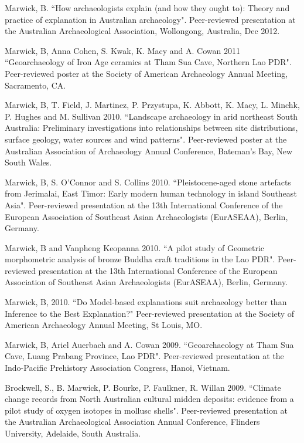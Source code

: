 {{{\ind Marwick, B. ``How archaeologists explain (and how they ought to): Theory and practice of explanation in Australian archaeology". Peer-reviewed presentation at the Australian Archaeological Association, Wollongong, Australia, Dec 2012.

\ind Marwick, B, Anna Cohen, S. Kwak, K. Macy and A. Cowan 2011 ``Geoarchaeology of Iron Age ceramics at Tham Sua Cave, Northern Lao PDR". Peer-reviewed poster at the Society of American Archaeology Annual Meeting, Sacramento, CA.

\ind Marwick, B, T. Field, J. Martinez, P. Przystupa, K. Abbott, K. Macy, L. Minchk, P. Hughes and M. Sullivan 2010. ``Landscape archaeology in arid northeast South Australia: Preliminary investigations into relationships between site distributions, surface geology, water sources and wind patterns". Peer-reviewed poster at the Australian Association of Archaeology Annual Conference, Bateman’s Bay, New South Wales.

\ind Marwick, B, S. O’Connor and S. Collins 2010. ``Pleistocene-aged stone artefacts from Jerimalai, East Timor: Early modern human technology in island Southeast Asia". Peer-reviewed presentation at the 13th International Conference of the European Association of Southeast Asian Archaeologists (EurASEAA), Berlin, Germany.

\ind Marwick, B and Vanpheng Keopanna 2010. ``A pilot study of Geometric morphometric analysis of bronze Buddha craft traditions in the Lao PDR". Peer-reviewed presentation  at the 13th International Conference of the European Association of Southeast Asian Archaeologists (EurASEAA), Berlin, Germany.

\ind Marwick, B, 2010. ``Do Model-based explanations suit archaeology better than Inference to the Best Explanation?" Peer-reviewed presentation at the Society of American Archaeology Annual Meeting, St Louis, MO.

\ind Marwick, B, Ariel Auerbach and A. Cowan 2009. ``Geoarchaeology at Tham Sua Cave, Luang Prabang Province, Lao PDR". Peer-reviewed presentation at the Indo-Pacific Prehistory Association Congress, Hanoi, Vietnam.

\ind Brockwell, S., B. Marwick, P. Bourke, P. Faulkner, R. Willan 2009. ``Climate change records from North Australian cultural midden deposits: evidence from a pilot study of oxygen isotopes in mollusc shells". Peer-reviewed presentation  at the Australian Archaeological Association Annual Conference, Flinders University, Adelaide, South Australia.

}}}
